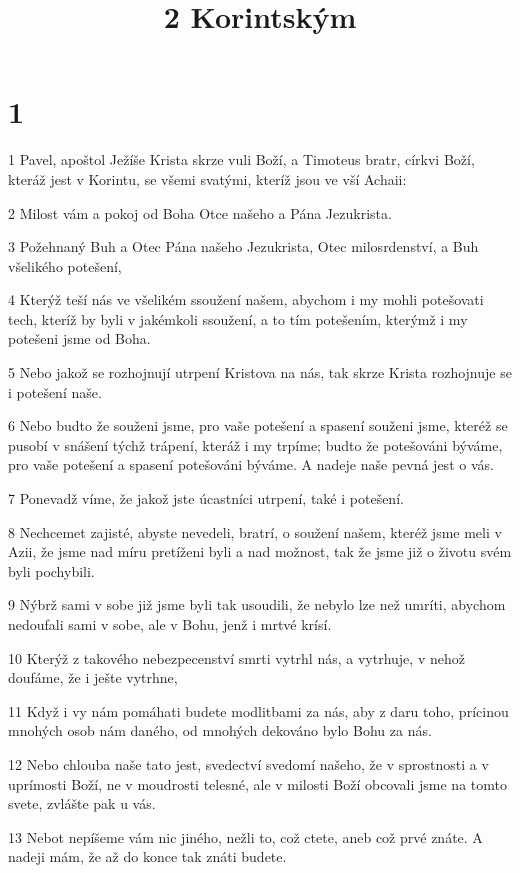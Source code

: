 

\title{2 Korintským}

\chapter{1}

\par 1 Pavel, apoštol Ježíše Krista skrze vuli Boží, a Timoteus bratr, církvi Boží, kteráž jest v Korintu, se všemi svatými, kteríž jsou ve vší Achaii:
\par 2 Milost vám a pokoj od Boha Otce našeho a Pána Jezukrista.
\par 3 Požehnaný Buh a Otec Pána našeho Jezukrista, Otec milosrdenství, a Buh všelikého potešení,
\par 4 Kterýž teší nás ve všelikém ssoužení našem, abychom i my mohli potešovati tech, kteríž by byli v jakémkoli ssoužení, a to tím potešením, kterýmž i my potešeni jsme od Boha.
\par 5 Nebo jakož se rozhojnují utrpení Kristova na nás, tak skrze Krista rozhojnuje se i potešení naše.
\par 6 Nebo budto že souženi jsme, pro vaše potešení a spasení souženi jsme, kteréž se pusobí v snášení týchž trápení, kteráž i my trpíme; budto že potešováni býváme, pro vaše potešení a spasení potešováni býváme. A nadeje naše pevná jest o vás.
\par 7 Ponevadž víme, že jakož jste úcastníci utrpení, také i potešení.
\par 8 Nechcemet zajisté, abyste nevedeli, bratrí, o soužení našem, kteréž jsme meli v Azii, že jsme nad míru pretíženi byli a nad možnost, tak že jsme již o životu svém byli pochybili.
\par 9 Nýbrž sami v sobe již jsme byli tak usoudili, že nebylo lze než umríti, abychom nedoufali sami v sobe, ale v Bohu, jenž i mrtvé krísí.
\par 10 Kterýž z takového nebezpecenství smrti vytrhl nás, a vytrhuje, v nehož doufáme, že i ješte vytrhne,
\par 11 Když i vy nám pomáhati budete modlitbami za nás, aby z daru toho, prícinou mnohých osob nám daného, od mnohých dekováno bylo Bohu za nás.
\par 12 Nebo chlouba naše tato jest, svedectví svedomí našeho, že v sprostnosti a v uprímosti Boží, ne v moudrosti telesné, ale v milosti Boží obcovali jsme na tomto svete, zvlášte pak u vás.
\par 13 Nebot nepíšeme vám nic jiného, nežli to, což ctete, aneb což prvé znáte. A nadeji mám, že až do konce tak znáti budete.
